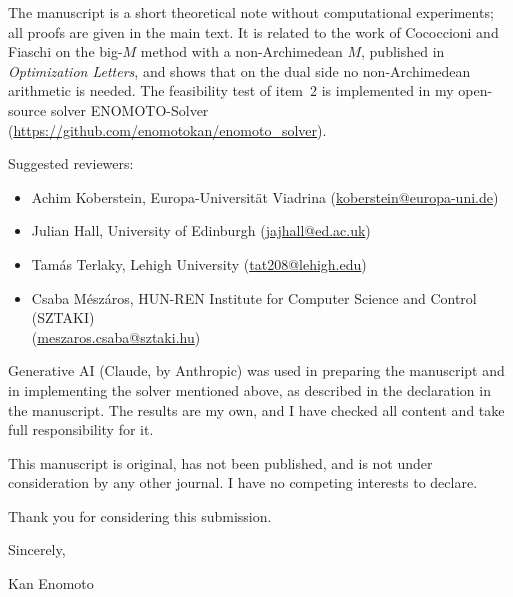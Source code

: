 \documentclass[11pt,a4paper]{article}
\begin{document}
The manuscript is a short theoretical note without computational experiments; all proofs are given in the main text. It is related to the work of Cococcioni and Fiaschi on the big-$M$ method with a non-Archimedean $M$, published in \textit{Optimization Letters}, and shows that on the dual side no non-Archimedean arithmetic is needed. The feasibility test of item~2 is implemented in my open-source solver ENOMOTO-Solver (\url{https://github.com/enomotokan/enomoto_solver}).

Suggested reviewers:
\begin{itemize}[leftmargin=*,topsep=0pt,itemsep=0pt]
\item Achim Koberstein, Europa-Universität Viadrina (\href{mailto:koberstein@europa-uni.de}{koberstein@europa-uni.de})
\item Julian Hall, University of Edinburgh (\href{mailto:jajhall@ed.ac.uk}{jajhall@ed.ac.uk})
\item Tamás Terlaky, Lehigh University (\href{mailto:tat208@lehigh.edu}{tat208@lehigh.edu})
\item Csaba Mészáros, HUN-REN Institute for Computer Science and Control (SZTAKI)\\ (\href{mailto:meszaros.csaba@sztaki.hu}{meszaros.csaba@sztaki.hu})
\end{itemize}

Generative AI (Claude, by Anthropic) was used in preparing the manuscript and in implementing the solver mentioned above, as described in the declaration in the manuscript. The results are my own, and I have checked all content and take full responsibility for it.

This manuscript is original, has not been published, and is not under consideration by any other journal. I have no competing interests to declare.

Thank you for considering this submission.

Sincerely,

Kan Enomoto
\end{document}
